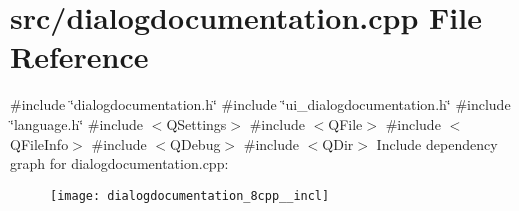 \section{src/dialogdocumentation.cpp File Reference}
\label{dialogdocumentation_8cpp}
{\ttfamily \#include \char`\"{}dialogdocumentation.\+h\char`\"{}}\newline
{\ttfamily \#include \char`\"{}ui\+\_\+dialogdocumentation.\+h\char`\"{}}\newline
{\ttfamily \#include \char`\"{}language.\+h\char`\"{}}\newline
{\ttfamily \#include $<$Q\+Settings$>$}\newline
{\ttfamily \#include $<$Q\+File$>$}\newline
{\ttfamily \#include $<$Q\+File\+Info$>$}\newline
{\ttfamily \#include $<$Q\+Debug$>$}\newline
{\ttfamily \#include $<$Q\+Dir$>$}\newline
Include dependency graph for dialogdocumentation.\+cpp\+:
\nopagebreak
\begin{figure}[H]
\begin{center}
\leavevmode
\texttt{[image: dialogdocumentation\_8cpp\_\_incl]}
\end{center}
\end{figure}
